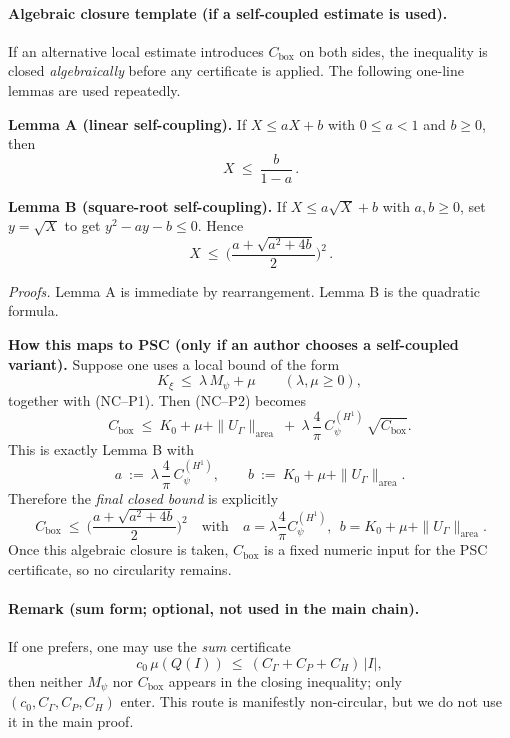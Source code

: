 \documentclass[11pt]{article}
\theoremstyle{definition}
\theoremstyle{remark}
\begin{document}
\paragraph{Algebraic closure template (if a self-coupled estimate is used).}
If an alternative local estimate introduces $C_{\mathrm{box}}$ on both sides, the inequality is closed \emph{algebraically} before any certificate is applied. The following one-line lemmas are used repeatedly.

\medskip
\noindent\textbf{Lemma A (linear self-coupling).}
If $X\le aX+b$ with $0\le a<1$ and $b\ge0$, then
\[
\boxed{\,X\ \le\ \frac{b}{1-a}\,}.
\]

\noindent\textbf{Lemma B (square-root self-coupling).}
If $X\le a\sqrt{X}+b$ with $a,b\ge0$, set $y=\sqrt{X}$ to get
$y^2-ay-b\le0$. Hence
\[
\boxed{\,X\ \le\ \Big(\frac{a+\sqrt{a^2+4b}}{2}\Big)^{\!2}\,}.
\]

\noindent\emph{Proofs.} Lemma A is immediate by rearrangement. Lemma B is the quadratic formula.

\medskip
\noindent\textbf{How this maps to PSC (only if an author chooses a self-coupled variant).}
Suppose one uses a local bound of the form
\[
K_\xi\ \le\ \lambda\,M_\psi+\mu\qquad(\lambda,\mu\ge0),
\]
together with (NC--P1). Then (NC--P2) becomes
\[
C_{\mathrm{box}}\ \le\ K_0+\mu+\|U_\Gamma\|_{\mathrm{area}}\ +\ \lambda\,\frac{4}{\pi}\,C_\psi^{(H^1)}\,\sqrt{C_{\mathrm{box}}}.
\]
This is exactly Lemma B with
\[
a\ :=\ \lambda\,\frac{4}{\pi}\,C_\psi^{(H^1)},
\qquad
b\ :=\ K_0+\mu+\|U_\Gamma\|_{\mathrm{area}}.
\]
Therefore the \emph{final closed bound} is explicitly
\[
\boxed{\,C_{\mathrm{box}}\ \le\ \Big(\frac{a+\sqrt{a^2+4b}}{2}\Big)^{\!2}}
\quad\text{with}\quad
a=\lambda\frac{4}{\pi}C_\psi^{(H^1)},\ \ b=K_0+\mu+\|U_\Gamma\|_{\mathrm{area}}.
\]
Once this algebraic closure is taken, $C_{\mathrm{box}}$ is a fixed numeric input for the PSC certificate, so no circularity remains.

\paragraph{Remark (sum form; optional, not used in the main chain).}
If one prefers, one may use the \emph{sum} certificate
\[
c_0\,\mu(Q(I))\ \le\ (C_\Gamma+C_P+C_H)\,|I|,
\]
then neither $M_\psi$ nor $C_{\mathrm{box}}$ appears in the closing inequality; only $(c_0,C_\Gamma,C_P,C_H)$ enter. This route is manifestly non-circular, but we do not use it in the main proof.
\end{document}
